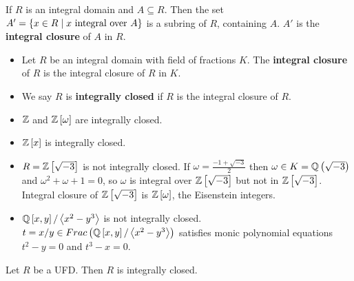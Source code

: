 \begin{corollary}
If $ R $ is an integral domain and $ A \subseteq R $. Then the set $ A' = \cb{x \in R \mid x \ \text{integral over} \ A} $ is a subring of $ R $, containing $ A $. $ A' $ is the \textbf{integral closure} of $ A $ in $ R $.
\end{corollary}

\begin{definition}
\hfill
\begin{itemize}
\item Let $ R $ be an integral domain with field of fractions $ K $. The \textbf{integral closure} of $ R $ is the integral closure of $ R $ in $ K $.
\item We say $ R $ is \textbf{integrally closed} if $ R $ is the integral closure of $ R $.
\end{itemize}
\end{definition}

\begin{example*}
\hfill
\begin{itemize}
\item $ \mathbb{Z} $ and $ \mathbb{Z}\left[ \omega \right] $ are integrally closed.
\item $ \mathbb{Z}\left[ x \right] $ is integrally closed.
\item $ R = \mathbb{Z}\left[ \sqrt{-3} \right] $ is not integrally closed. If $ \omega = \tfrac{-1 + \sqrt{-3}}{2} $ then $ \omega \in K = \mathbb{Q}\left( \sqrt{-3} \right) $ and $ \omega^2 + \omega + 1 = 0 $, so $ \omega $ is integral over $ \mathbb{Z}\left[ \sqrt{-3} \right] $ but not in $ \mathbb{Z}\left[ \sqrt{-3} \right] $. Integral closure of $ \mathbb{Z}\left[ \sqrt{-3} \right] $ is $ \mathbb{Z}\left[ \omega \right] $, the Eisenstein integers.
\item $ \mathbb{Q}\left[ x, y \right] / \left\langle x^2 - y^3 \right\rangle $ is not integrally closed. $ t = x / y \in Frac\left( \mathbb{Q}\left[ x, y \right] / \left\langle x^2 - y^3 \right\rangle \right) $ satisfies monic polynomial equations $ t^2 - y = 0 $ and $ t^3 - x = 0 $.
\end{itemize}
\end{example*}


\begin{proposition}
Let $ R $ be a UFD. Then $ R $ is integrally closed.
\end{proposition}

